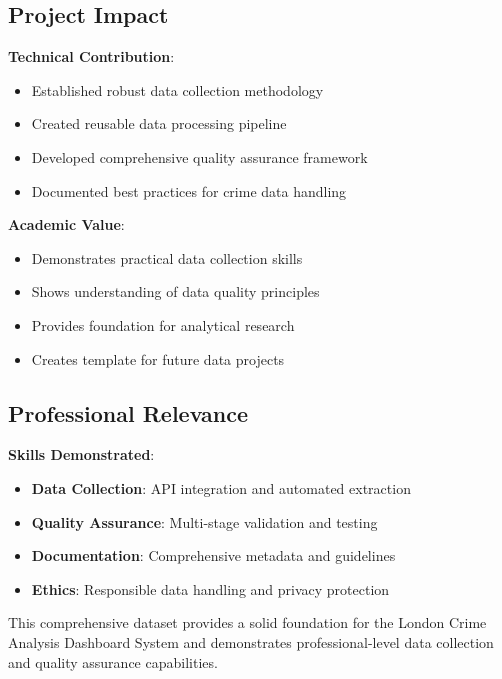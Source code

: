 \documentclass[12pt,a4paper]{article}
\begin{document}
\subsection{Project Impact}

\textbf{Technical Contribution}:
\begin{itemize}
    \item Established robust data collection methodology
    \item Created reusable data processing pipeline
    \item Developed comprehensive quality assurance framework
    \item Documented best practices for crime data handling
\end{itemize}

\textbf{Academic Value}:
\begin{itemize}
    \item Demonstrates practical data collection skills
    \item Shows understanding of data quality principles
    \item Provides foundation for analytical research
    \item Creates template for future data projects
\end{itemize}

\subsection{Professional Relevance}

\textbf{Skills Demonstrated}:
\begin{itemize}
    \item \textbf{Data Collection}: API integration and automated extraction
    \item \textbf{Quality Assurance}: Multi-stage validation and testing
    \item \textbf{Documentation}: Comprehensive metadata and guidelines
    \item \textbf{Ethics}: Responsible data handling and privacy protection
\end{itemize}

This comprehensive dataset provides a solid foundation for the London Crime Analysis Dashboard System and demonstrates professional-level data collection 
and quality assurance capabilities.
\end{document}
